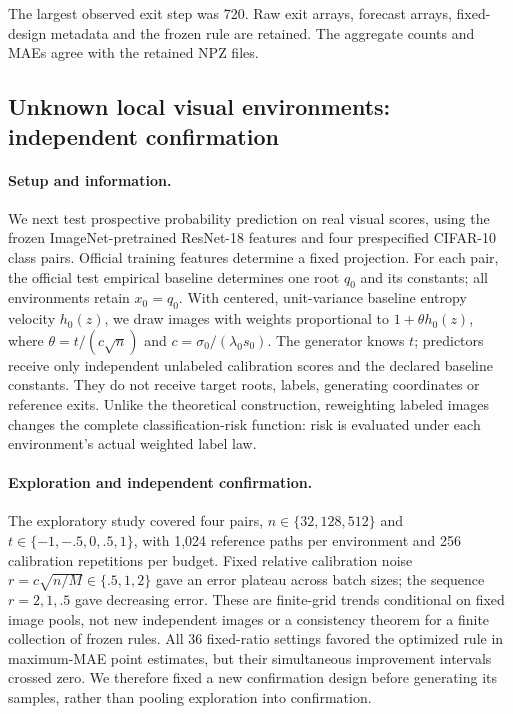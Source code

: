 The largest observed exit step was 720. Raw exit arrays, forecast arrays, fixed-design metadata and the frozen rule are retained. The aggregate counts and MAEs agree with the retained NPZ files.

\subsection{Unknown local visual environments: independent confirmation}\label{visual-confirmation}

\paragraph{Setup and information.} We next test prospective probability prediction on real visual scores, using the frozen ImageNet-pretrained ResNet-18 features and four prespecified CIFAR-10 class pairs. Official training features determine a fixed projection. For each pair, the official test empirical baseline determines one root $q_0$ and its constants; all environments retain $x_0=q_0$. With centered, unit-variance baseline entropy velocity $h_0(z)$, we draw images with weights proportional to $1+\theta h_0(z)$, where $\theta=t/(c\sqrt n)$ and $c=\sigma_0/(\lambda_0s_0)$. The generator knows $t$; predictors receive only independent unlabeled calibration scores and the declared baseline constants. They do not receive target roots, labels, generating coordinates or reference exits. Unlike the theoretical construction, reweighting labeled images changes the complete classification-risk function: risk is evaluated under each environment's actual weighted label law.

\paragraph{Exploration and independent confirmation.} The exploratory study covered four pairs, $n\in\{32,128,512\}$ and $t\in\{-1,-.5,0,.5,1\}$, with 1,024 reference paths per environment and 256 calibration repetitions per budget. Fixed relative calibration noise $r=c\sqrt{n/M}\in\{.5,1,2\}$ gave an error plateau across batch sizes; the sequence $r=2,1,.5$ gave decreasing error. These are finite-grid trends conditional on fixed image pools, not new independent images or a consistency theorem for a finite collection of frozen rules. All 36 fixed-ratio settings favored the optimized rule in maximum-MAE point estimates, but their simultaneous improvement intervals crossed zero. We therefore fixed a new confirmation design before generating its samples, rather than pooling exploration into confirmation.

